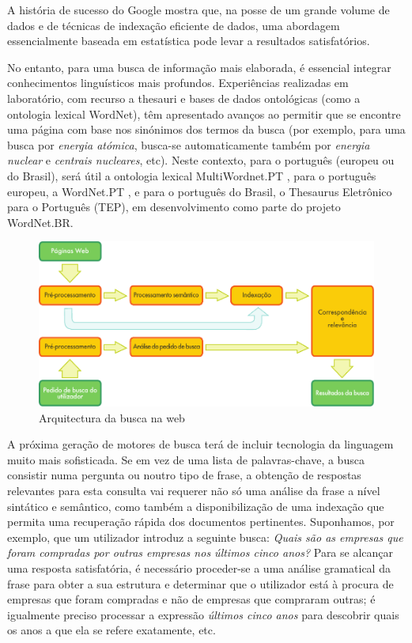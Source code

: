 \begin{multicols}{2}
A história de sucesso do Google mostra que, na posse de um grande volume de dados e de técnicas de indexação eficiente de dados, 
uma abordagem essencialmente baseada em estatística pode levar a resultados satisfatórios.

No entanto, para uma busca de informação mais elaborada, é essencial integrar co\-nhe\-ci\-men\-tos linguísticos mais profundos. 
Experiências realizadas em laboratório, com recurso a thesauri e bases de dados ontológicas (como a ontologia lexical WordNet), 
têm apresentado avanços ao permitir que se encontre uma página com base nos sinónimos dos termos da busca 
(por exemplo, para uma busca por \textit{energia atómica}, busca-se automaticamente também por \textit{energia nuclear} e \textit{centrais nucleares}, etc). 
Neste contexto, para o português (europeu ou do Brasil), será útil a ontologia lexical MultiWordnet.PT \cite{multiwordnet}, 
para o português europeu, a WordNet.PT \cite{wordnetpt},
e para o português do Brasil, o Thesaurus Eletrônico para o Português (TEP), em desenvolvimento como parte do projeto WordNet.BR.

\begin{figure}[htb]
  \center
  \includegraphics[width=\textwidth]{../_media/portuguese/web_search_architecture}
  \caption{Arquitectura da busca na web}
  \label{fig:websearcharch_de}
\end{figure}


A próxima geração de motores de busca terá de incluir tecnologia da linguagem muito mais sofisticada. 
Se em vez de uma lista de palavras-chave, a busca consistir numa pergunta ou noutro tipo de frase, a obtenção de respostas relevantes para esta consulta vai requerer não só uma análise da frase a nível sintático e semântico, como também a disponibilização de uma indexação que permita uma recuperação rápida dos documentos pertinentes. 
Suponhamos, por exemplo, que um utilizador introduz a seguinte busca: 
\textit{Quais são as empresas que foram compradas por ou\-tras empresas nos últimos cinco anos?}
Para se alcançar uma res\-pos\-ta satisfatória, é necessário proceder-se a uma análise gramatical da frase para obter a sua estrutura e determinar 
que o utilizador está à procura de empresas que foram compradas e não de empresas que compraram ou\-tras;
é igualmente preciso processar a expressão \textit{últimos cinco anos} para descobrir quais os anos a que ela se refere exatamente, etc.


\end{multicols}
